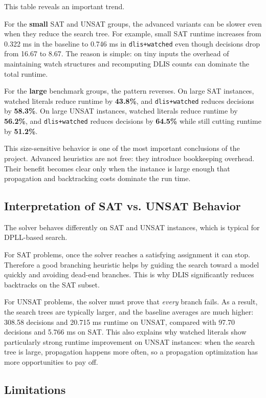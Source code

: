 \documentclass[11pt]{article}
\begin{document}
This table reveals an important trend.

For the \textbf{small} SAT and UNSAT groups, the advanced variants can be
slower even when they reduce the search tree. For example, small SAT runtime
increases from 0.322 ms in the baseline to 0.746 ms in \texttt{dlis+watched}
even though decisions drop from 16.67 to 8.67. The reason is simple: on tiny
inputs the overhead of maintaining watch structures and recomputing DLIS counts
can dominate the total runtime.

For the \textbf{large} benchmark groups, the pattern reverses. On large SAT
instances, watched literals reduce runtime by \textbf{43.8\%}, and
\texttt{dlis+watched} reduces decisions by \textbf{58.3\%}. On large UNSAT
instances, watched literals reduce runtime by \textbf{56.2\%}, and
\texttt{dlis+watched} reduces decisions by \textbf{64.5\%} while still cutting
runtime by \textbf{51.2\%}.

This size-sensitive behavior is one of the most important conclusions of the
project. Advanced heuristics are not free: they introduce bookkeeping overhead.
Their benefit becomes clear only when the instance is large enough that
propagation and backtracking costs dominate the run time.

\subsection{Interpretation of SAT vs. UNSAT Behavior}

The solver behaves differently on SAT and UNSAT instances, which is typical for
DPLL-based search.

For SAT problems, once the solver reaches a satisfying assignment it can stop.
Therefore a good branching heuristic helps by guiding the search toward a model
quickly and avoiding dead-end branches. This is why DLIS significantly reduces
backtracks on the SAT subset.

For UNSAT problems, the solver must prove that \emph{every} branch fails. As a
result, the search trees are typically larger, and the baseline averages are
much higher: 308.58 decisions and 20.715 ms runtime on UNSAT, compared with
97.70 decisions and 5.766 ms on SAT. This also explains why watched literals
show particularly strong runtime improvement on UNSAT instances: when the search
tree is large, propagation happens more often, so a propagation optimization has
more opportunities to pay off.

\subsection{Limitations}
\end{document}
